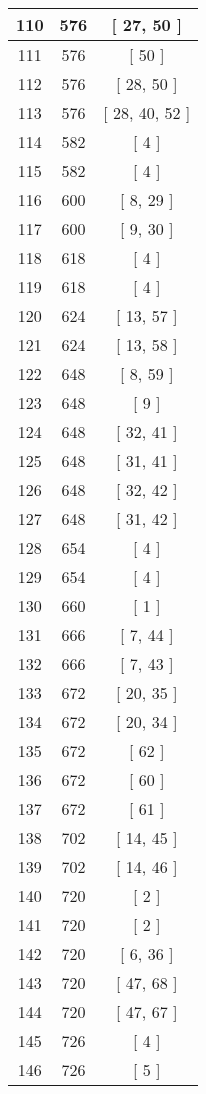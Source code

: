 \begin{center}
\begin{longtable}[H]{|| c c c ||}
\hline
110 & 576 & [ 27, 50 ] \\ 
\hline
111 & 576 & [ 50 ] \\ 
\hline
112 & 576 & [ 28, 50 ] \\ 
\hline
113 & 576 & [ 28, 40, 52 ] \\ 
\hline
114 & 582 & [ 4 ] \\ 
\hline
115 & 582 & [ 4 ] \\ 
\hline
116 & 600 & [ 8, 29 ] \\ 
\hline
117 & 600 & [ 9, 30 ] \\ 
\hline
118 & 618 & [ 4 ] \\ 
\hline
119 & 618 & [ 4 ] \\ 
\hline
120 & 624 & [ 13, 57 ] \\ 
\hline
121 & 624 & [ 13, 58 ] \\ 
\hline
122 & 648 & [ 8, 59 ] \\ 
\hline
123 & 648 & [ 9 ] \\ 
\hline
124 & 648 & [ 32, 41 ] \\ 
\hline
125 & 648 & [ 31, 41 ] \\ 
\hline
126 & 648 & [ 32, 42 ] \\ 
\hline
127 & 648 & [ 31, 42 ] \\ 
\hline
128 & 654 & [ 4 ] \\ 
\hline
129 & 654 & [ 4 ] \\ 
\hline
130 & 660 & [ 1 ] \\ 
\hline
131 & 666 & [ 7, 44 ] \\ 
\hline
132 & 666 & [ 7, 43 ] \\ 
\hline
133 & 672 & [ 20, 35 ] \\ 
\hline
134 & 672 & [ 20, 34 ] \\ 
\hline
135 & 672 & [ 62 ] \\ 
\hline
136 & 672 & [ 60 ] \\ 
\hline
137 & 672 & [ 61 ] \\ 
\hline
138 & 702 & [ 14, 45 ] \\ 
\hline
139 & 702 & [ 14, 46 ] \\ 
\hline
140 & 720 & [ 2 ] \\ 
\hline
141 & 720 & [ 2 ] \\ 
\hline
142 & 720 & [ 6, 36 ] \\ 
\hline
143 & 720 & [ 47, 68 ] \\ 
\hline
144 & 720 & [ 47, 67 ] \\ 
\hline
145 & 726 & [ 4 ] \\ 
\hline
146 & 726 & [ 5 ] \\ 

\end{longtable}
\end{center}
